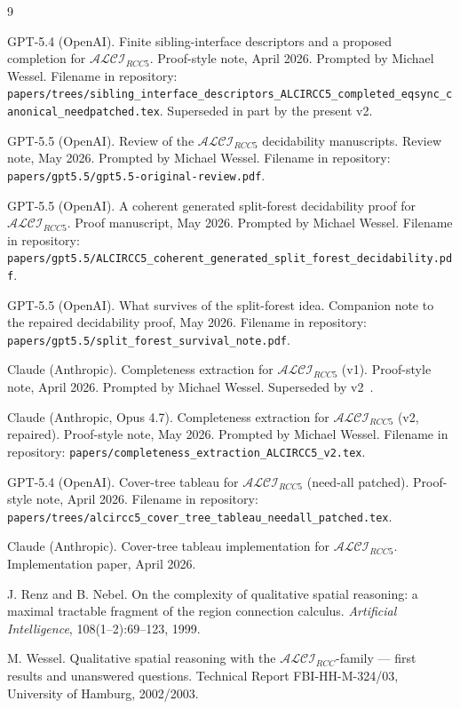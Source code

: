 \documentclass[11pt]{article}
\theoremstyle{definition}
\theoremstyle{remark}
\begin{document}
\begin{thebibliography}{9}

GPT-5.4 (OpenAI).
\newblock Finite sibling-interface descriptors and a proposed
  completion for $\mathcal{ALCI}_{RCC5}$.
\newblock Proof-style note, April 2026. Prompted by Michael Wessel.
\newblock Filename in repository:
  \texttt{papers/trees/sibling\_interface\_descriptors\_ALCIRCC5\_completed\_eqsync\_canonical\_needpatched.tex}.
\newblock Superseded in part by the present v2.

GPT-5.5 (OpenAI).
\newblock Review of the $\mathcal{ALCI}_{RCC5}$ decidability
  manuscripts.
\newblock Review note, May 2026. Prompted by Michael Wessel.
\newblock Filename in repository:
  \texttt{papers/gpt5.5/gpt5.5-original-review.pdf}.

GPT-5.5 (OpenAI).
\newblock A coherent generated split-forest decidability proof for
  $\mathcal{ALCI}_{RCC5}$.
\newblock Proof manuscript, May 2026. Prompted by Michael Wessel.
\newblock Filename in repository:
  \texttt{papers/gpt5.5/ALCIRCC5\_coherent\_generated\_split\_forest\_decidability.pdf}.

GPT-5.5 (OpenAI).
\newblock What survives of the split-forest idea.
\newblock Companion note to the repaired decidability proof, May 2026.
\newblock Filename in repository:
  \texttt{papers/gpt5.5/split\_forest\_survival\_note.pdf}.

Claude (Anthropic).
\newblock Completeness extraction for $\mathcal{ALCI}_{RCC5}$ (v1).
\newblock Proof-style note, April 2026. Prompted by Michael Wessel.
\newblock Superseded by v2~\cite{CompletenessV2}.

Claude (Anthropic, Opus 4.7).
\newblock Completeness extraction for $\mathcal{ALCI}_{RCC5}$ (v2,
  repaired).
\newblock Proof-style note, May 2026. Prompted by Michael Wessel.
\newblock Filename in repository:
  \texttt{papers/completeness\_extraction\_ALCIRCC5\_v2.tex}.

GPT-5.4 (OpenAI).
\newblock Cover-tree tableau for $\mathcal{ALCI}_{RCC5}$
  (need-all patched).
\newblock Proof-style note, April 2026.
\newblock Filename in repository:
  \texttt{papers/trees/alcircc5\_cover\_tree\_tableau\_needall\_patched.tex}.

Claude (Anthropic).
\newblock Cover-tree tableau implementation for $\mathcal{ALCI}_{RCC5}$.
\newblock Implementation paper, April 2026.

J. Renz and B. Nebel.
\newblock On the complexity of qualitative spatial reasoning: a maximal
  tractable fragment of the region connection calculus.
\newblock \emph{Artificial Intelligence}, 108(1--2):69--123, 1999.

M. Wessel.
\newblock Qualitative spatial reasoning with the
  $\mathcal{ALCI}_\mathit{RCC}$-family --- first results and
  unanswered questions.
\newblock Technical Report FBI-HH-M-324/03, University of Hamburg,
  2002/2003.

\end{thebibliography}
\end{document}
